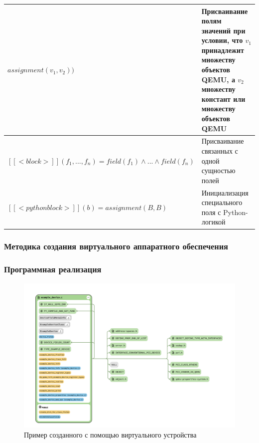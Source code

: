 \begin{frame}[allowframebreaks]
{\begin{longtable}{| p{6cm} | p{5cm} |}
{                      $assignment(v_1, v_2))$}
            & Присваивание полям значений при условии, что $v_1$
            принадлежит множеству объектов QEMU, а $v_2$ множеству
            констант или множеству объектов QEMU \\
            \hline
            $[[<block>]](f_1,...,f_n) = field(f_1) \land ... \land field(f_n)$
            & Присваивание связанных с одной сущностью полей \\
            \hline
            $[[<python block>]](b) = assignment(B,B)$
            & Инициализация специального поля с Python-логикой\\
            \hline
        \end{longtable}
    }
\end{frame}%


\begin{frame}%
    \frametitle{Методика создания виртуального аппаратного обеспечения}
    \begin{figure}[!htbp]
        \hspace*{-5cm}
        \scalebox{0.56}{
            
        }
    \end{figure}
\end{frame}


\begin{frame}%
    \frametitle{Программная реализация}
    \begin{figure}[!htbp]
        \begin{adjustbox}{max totalsize={\textwidth}{\textheight}}
            \includegraphics[]{images/experimental-device-class-diag.png}
        \end{adjustbox}
        \caption{Пример созданного с помощью {\mylanguage} виртуального устройства}
    \end{figure}
\end{frame}



